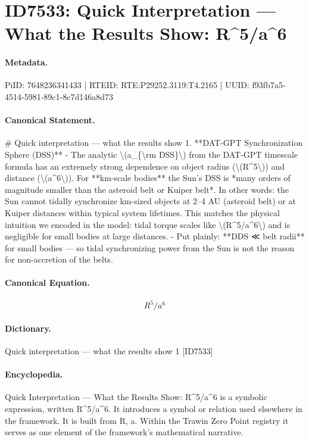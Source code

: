 \section*{ID7533: Quick Interpretation — What the Results Show: R\textasciicircum{}5/a\textasciicircum{}6}
\paragraph{Metadata.}
PiID: 7648236341433 | RTEID: RTE:P29252.3119:T4.2165 | UUID: f93fb7a5-4514-5981-89c1-8c7d146a8d73

\paragraph{Canonical Statement.}
\# Quick interpretation — what the results show 1. **DAT-GPT Synchronization Sphere (DSS)** - The analytic \textbackslash{}(a\_\{\textbackslash{}rm DSS\}\textbackslash{}) from the DAT-GPT timescale formula has an extremely strong dependence on object radius (\textbackslash{}(R\textasciicircum{}5\textbackslash{})) and distance (\textbackslash{}(a\textasciicircum{}6\textbackslash{})). For **km-scale bodies** the Sun’s DSS is *many orders of magnitude smaller than the asteroid belt or Kuiper belt*. In other words: the Sun cannot tidally synchronize km-sized objects at 2–4 AU (asteroid belt) or at Kuiper distances within typical system lifetimes. This matches the physical intuition we encoded in the model: tidal torque scales like \textbackslash{}(R\textasciicircum{}5/a\textasciicircum{}6\textbackslash{}) and is negligible for small bodies at large distances. - Put plainly: **DDS ≪ belt radii** for small bodies — so tidal synchronizing power from the Sun is not the reason for non-accretion of the belts.

\paragraph{Canonical Equation.}
\[
R^5/a^6
\]

\paragraph{Dictionary.}
Quick interpretation — what the results show 1 [ID7533]

\paragraph{Encyclopedia.}
Quick Interpretation — What the Results Show: R\textasciicircum{}5/a\textasciicircum{}6 is a symbolic expression, written R\textasciicircum{}5/a\textasciicircum{}6. It introduces a symbol or relation used elsewhere in the framework. It is built from R, a. Within the Trawin Zero Point registry it serves as one element of the framework's mathematical narrative.
